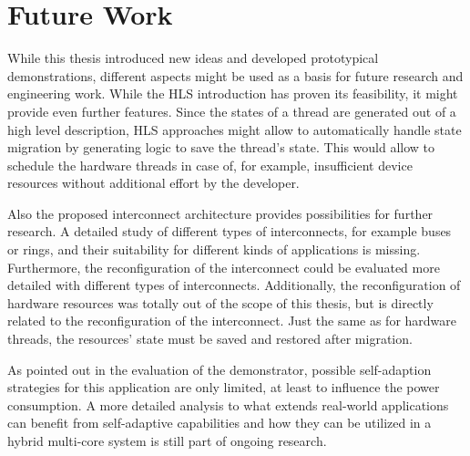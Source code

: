 \section{Future Work}
While this thesis introduced new ideas and developed prototypical
demonstrations, different aspects might be used as a basis for future research
and engineering work. While the \ac{HLS} introduction has proven its
feasibility, it might provide even further features. Since the states of a
thread are generated out of a high level description, \ac{HLS} approaches
might allow to automatically handle state migration by generating logic to
save the thread's state. This would allow to schedule the hardware threads in
case of, for example, insufficient device resources without additional effort
by the developer.

Also the proposed interconnect architecture provides possibilities for further
research. A detailed study of different types of interconnects, for example
buses or rings, and their suitability for different kinds of applications is
missing. Furthermore, the reconfiguration of the interconnect could be
evaluated more detailed with different types of interconnects. Additionally,
the reconfiguration of hardware resources was totally out of the scope of this
thesis, but is directly related to the reconfiguration of the interconnect.
Just the same as for hardware threads, the resources' state must be saved and
restored after migration.

As pointed out in the evaluation of the demonstrator, possible self-adaption
strategies for this application are only limited, at least to influence the
power consumption. A more detailed analysis to what extends real-world
applications can benefit from self-adaptive capabilities and how they can be
utilized in a hybrid multi-core system is still part of ongoing research.